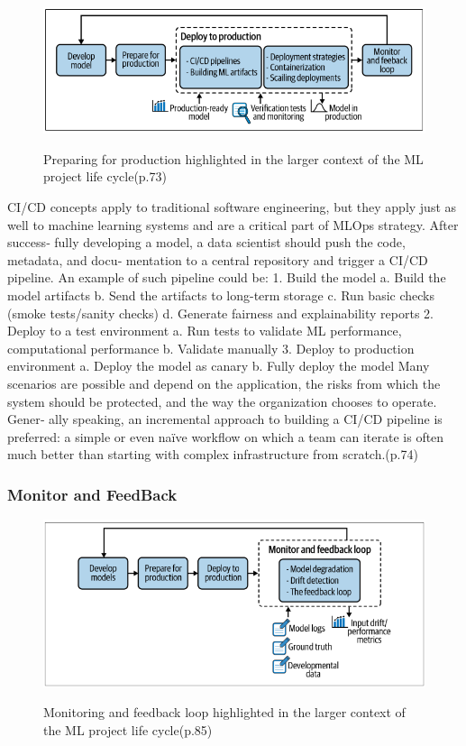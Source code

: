 \begin{figure}[!htbp]
    \caption{Preparing for production highlighted in the larger context of the ML project
    life cycle\cite{treveil2020introducing}(p.73)}
    \centering
    \includegraphics[scale=0.5]{images/deploy-prod}
    \label{fig:deploy-prod}
\end{figure}

CI/CD concepts apply to traditional software engineering, but they apply just as well
to machine learning systems and are a critical part of MLOps strategy. After success‐
fully developing a model, a data scientist should push the code, metadata, and docu‐
mentation to a central repository and trigger a CI/CD pipeline. An example of such
pipeline could be:
1. Build the model
a. Build the model artifacts
b. Send the artifacts to long-term storage
c. Run basic checks (smoke tests/sanity checks)
d. Generate fairness and explainability reports
2. Deploy to a test environment
a. Run tests to validate ML performance, computational performance
b. Validate manually
3. Deploy to production environment
a. Deploy the model as canary
b. Fully deploy the model
Many scenarios are possible and depend on the application, the risks from which the
system should be protected, and the way the organization chooses to operate. Gener‐
ally speaking, an incremental approach to building a CI/CD pipeline is preferred: a
simple or even naïve workflow on which a team can iterate is often much better than
starting with complex infrastructure from scratch.\cite{treveil2020introducing}(p.74)

\subsubsection{Monitor and FeedBack}

\begin{figure}[!htbp]
    \caption{Monitoring and feedback loop highlighted in the larger context of the ML
    project life cycle\cite{treveil2020introducing}(p.85)}
    \centering
    \includegraphics[scale=0.5]{images/monitor-intro}
    \label{fig:monitor-intro}
\end{figure}



